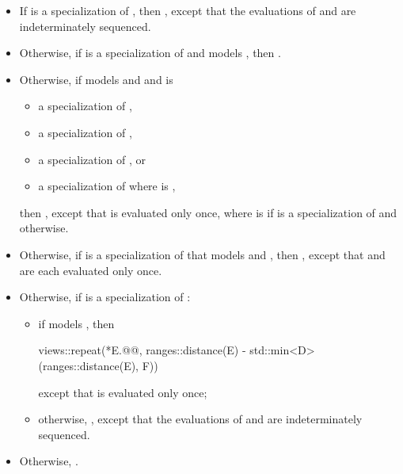 \begin{itemize}
\item
If  is a specialization of
,
then ,
except that the evaluations of  and 
are indeterminately sequenced.

\item
Otherwise, if  is a specialization of 
and  models , then
.

\item
Otherwise, if  models
 and 
and is
\begin{itemize}
\item a specialization of ,
\item a specialization of ,
\item a specialization of , or
\item a specialization of 
where  is ,
\end{itemize}
then ,
except that  is evaluated only once,
where  is 
if  is a specialization of  and  otherwise.

\item
Otherwise,
if  is
a specialization of 
that models  and ,
then
,
except that  and  are each evaluated only once.

\item
Otherwise, if  is
a specialization of :
\begin{itemize}
\item
if  models ,
then
\begin{codeblock}
views::repeat(*E.@@, ranges::distance(E) - std::min<D>(ranges::distance(E), F))
\end{codeblock}
except that  is evaluated only once;
\item
otherwise, ,
except that the evaluations of  and  are indeterminately sequenced.
\end{itemize}

\item
Otherwise, .
\end{itemize}

